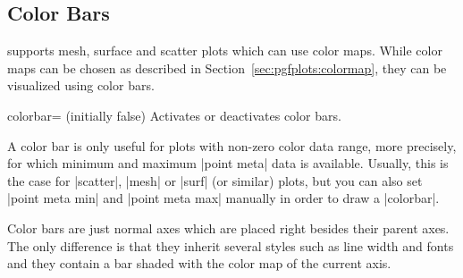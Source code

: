 \subsection{Color Bars}
\label{pgfplots:colorbar}

\PGFPlots{} supports mesh, surface and scatter plots which can use color maps.
While color maps can be chosen as described in Section~\ref{sec:pgfplots:colormap},
they can be visualized using color bars.

\begin{pgfplotskey}{colorbar= (initially false)}
    Activates or deactivates color bars.
\begin{codeexample}[]
\end{codeexample}

\begin{codeexample}[]
\end{codeexample}

\begin{codeexample}[]
\end{codeexample}

    A color bar is only useful for plots with non-zero color data range, more
    precisely, for which minimum and maximum |point meta| data is available.
    Usually, this is the case for |scatter|, |mesh| or |surf| (or similar)
    plots, but you can also set |point meta min| and |point meta max| manually
    in order to draw a |colorbar|.

    Color bars are just normal axes which are placed right besides their parent
    axes. The only difference is that they inherit several styles such as line
    width and fonts and they contain a bar shaded with the color map of the
    current axis.


\end{pgfplotskey}
